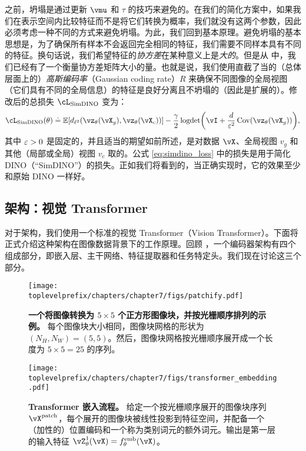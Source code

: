 \documentclass[../../book-main_zh.tex]{subfiles}
\begin{document}
之前，坍塌是通过更新 \(\vmu\) 和 \(\tau\) 的技巧来避免的。在我们的简化方案中，如果我们在表示空间内比较特征而不是将它们转换为概率，我们就没有这两个参数，因此必须考虑一种不同的方式来避免坍塌。为此，我们回到基本原理。避免坍塌的基本思想是，为了确保所有样本不会返回完全相同的特征，我们需要不同样本具有不同的特征。换句话说，我们希望特征的\textit{协方差}在某种意义上是\textit{大的}。但是从  中，我们已经有了一个衡量协方差矩阵大小的量。也就是说，我们使用直截了当的（总体层面上的）\textit{高斯编码率}（Gaussian coding rate）\(R\) 来确保不同图像的全局视图（它们具有不同的全局信息）的特征是良好分离且不坍塌的（因此是扩展的）。修改后的总损失 \(\cL_{\simdino}\) 变为：
\begin{equation}\label{eq:simdino_loss}
    \cL_{\simdino}(\theta) \doteq \Ex[d_{\ell^{2}}(\vz_{\theta}(\vX_{g}), \vz_{\theta}(\vX_{c}))] - \frac{\gamma}{2}\logdet\rp{\vI + \frac{d}{\eps^{2}}\Cov(\vz_{\theta}(\vX_{g}))},
\end{equation}
其中 \(\varepsilon > 0\) 是固定的，并且适当的期望如前所述，是对数据 \(\vX\)、全局视图 \(v_{g}\) 和其他（局部或全局）视图 \(v_{c}\) 取的。公式 \eqref{eq:simdino_loss} 中的损失是用于简化 DINO（“SimDINO”）的损失。正如我们将看到的，当正确实现时，它的效果至少和原始 DINO 一样好。

\subsection{架构：视觉 Transformer}\label{sub:contrastive_learning_architecture}

对于架构，我们使用一个标准的视觉 Transformer（Vision Transformer）。下面将正式介绍这种架构在图像数据背景下的工作原理。回顾 ，一个编码器架构有四个组成部分，即嵌入层、主干网络、特征提取器和任务特定头。我们现在讨论这三个部分。

\begin{figure}
    \centering 
    \texttt{[image: \\toplevelprefix/chapters/chapter7/figs/patchify.pdf]}
    \caption{\small\textbf{一个将图像转换为 \(5 \times 5\) 个正方形图像块，并按光栅顺序排列的示例。} 每个图像块大小相同，图像块网格的形状为 \((N_{H}, N_{W}) = (5, 5)\)。然后，图像块网格按光栅顺序展开成一个长度为 \(5 \times 5 = 25\) 的序列。}
    \label{fig:patchify_rasterize}
\end{figure}

\begin{figure}
    \centering 
    \texttt{[image: \\toplevelprefix/chapters/chapter7/figs/transformer\_embedding.pdf]}
    \caption{\small\textbf{Transformer 嵌入流程。} 给定一个按光栅顺序展开的图像块序列 \(\vX^{\patch}\)，每个展开的图像块被线性投影到特征空间，并配备一个（加性的）位置编码和一个称为类别词元的额外词元。输出是第一层的输入特征 \(\vZ_{\theta}^{1}(\vX) = f_{\theta}^{\emb}(\vX)\)。}
    \label{fig:transformer_embedding}
\end{figure}
\end{document}
